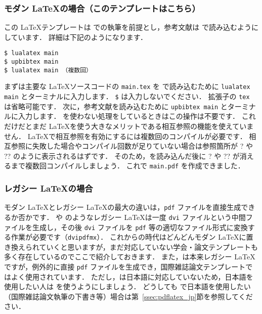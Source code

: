 \subsubsection*{モダン \LaTeX の場合（このテンプレートはこちら）}

この \LaTeX テンプレートは \LuaLaTeX での執筆を前提とし，参考文献は \upBibTeX で読み込むようにしています．
詳細は下記のようになります．

\begin{tcolorbox}[enhanced, title=\LuaLaTeX$+$\upBibTeX, drop fuzzy shadow]
\begin{verbatim}
$ lualatex main
$ upbibtex main
$ lualatex main （複数回）
\end{verbatim}
\end{tcolorbox}

まずは主要な \LaTeX ソースコードの \verb|main.tex| を \LuaLaTeX で読み込むために \verb|lualatex main| とターミナルに入力します．
\verb|$| は入力しないでください．
拡張子の \verb|tex| は省略可能です．
次に，参考文献を読み込むために \verb|upbibtex main| とターミナルに入力します．
\BibTeX を使わない処理をしているときはこの操作は不要です．
これだけだとまだ \LaTeX を使う大きなメリットである相互参照の機能を使えていません．
\LaTeX で相互参照を有効にするには複数回のコンパイルが必要です．
相互参照に失敗した場合やコンパイル回数が足りていない場合は参照箇所が ? や ?? のように表示されるはずです．
そのため，\upBibTeX を読み込んだ後に ? や ?? が消えるまで複数回コンパイルしましょう．
これで \verb|main.pdf| を作成できました．

\subsubsection*{レガシー \LaTeX の場合}

モダン \LaTeX とレガシー \LaTeX の最大の違いは，\verb|pdf| ファイルを直接生成できるか否かです．
\pLaTeX や \upLaTeX のようなレガシー \LaTeX は一度 \verb|dvi| ファイルという中間ファイルを生成し，その後 \verb|dvi| ファイルを \verb|pdf| 等の適切なファイル形式に変換する作業が必要です（\verb|dvipdfmx|）．
これからの時代はどんどんモダン \LaTeX に置き換えられていくと思いますが，まだ対応していない学会・論文テンプレートも多く存在しているのでここで紹介しておきます．
また，\pdfLaTeX は本来レガシー \LaTeX ですが，例外的に直接 \verb|pdf| ファイルを生成でき，国際雑誌論文テンプレートではよく使用されています．
ただし，\pdfLaTeX は日本語に対応していないため，日本語を使用したい人は \LuaLaTeX を使うようにしましょう．
どうしても \pdfLaTeX で日本語を使用したい（国際雑誌論文執筆の下書き等）場合は第~\ref{ssec:pdflatex_jp}節を参照してください．

